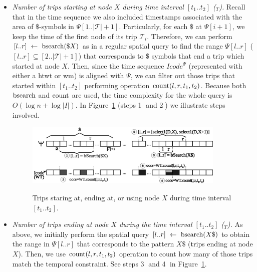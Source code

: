 	\begin{itemize}
	
		\item {\em Number of trips starting at node $X$ during time interval $[t_1..t_2]$ (\startX$_T$).}
		Recall that in the time sequence we also included timestamps associated with the area of $\$$-symbols in $\Psi[1..|\mathcal{T}|+1]$.
		Particularly, for each $\$$ at $\Psi[i+1]$, we keep the time of the first node of its trip $\mathcal{T}_i$. Therefore, 
		we can perform $[l..r]~\leftarrow~\operatorname{bsearch}(\$X)$ as in a regular spatial query to find the
		range $\Psi[l..r]$ ($[l..r]\subseteq [2..|\mathcal{T}|+1]$) that corresponds to $\$$ symbols that end a trip which started at node $X$. Then, since the time sequence $Icode^{\Psi}$ 
		(represented with either a \gls{htwt} or \gls{wm}) is
		 aligned with $\Psi$, we can filter out those trips that started within $[t_1..t_2]$ performing operation $\operatorname{count}(l,r,t_1,t_2)$. Because both $\operatorname{bsearch}$ and $\operatorname{count}$ are used, the time complexity for the whole query is $O(\log n + \log|I|)$. In Figure~\ref{fig:search2} (steps \textcircled{1} and \textcircled{2}) we illustrate steps involved.

	\begin{figure}[th]
		\begin{center}
			{\includegraphics[width=0.90\textwidth]{figures/search2.eps}}
		\end{center}
		\caption{Trips staring at, ending at, or using node $X$  during time interval $[t_1..t_2]$.}
		\label{fig:search2}
	\end{figure}
		
		\item {\em Number of trips ending at node $X$ during the time interval $[t_1..t_2]$ (\endX$_T$). }
		As above, we initially perform the spatial query $[l..r]~\leftarrow~\operatorname{bsearch}(X\$)$ to 
		obtain the range in $\Psi[l..r]$ that corresponds to the pattern $X\$$ (trips ending at node $X$). Then, we use  $\operatorname{count}(l,r,t_1,t_2)$ operation to count how many of those trips match the temporal constraint. See steps \textcircled{3} and \textcircled{4} in Figure~\ref{fig:search2}.
		

\end{itemize}
